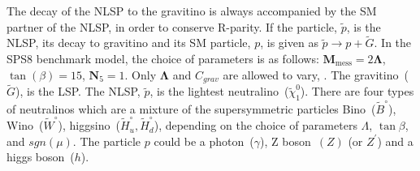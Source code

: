 {{%
The decay of the NLSP to the gravitino is always accompanied by the SM partner of the NLSP, in order to conserve R-parity.
If the particle, $\tilde{p}$, is the NLSP, its decay to gravitino and its SM particle, $p$, is given as $ \tilde{p}\rightarrow p + \tilde{G}$.
In the SPS8 benchmark model, the choice of parameters is as follows: $\mathbf{M}_{\mbox{mess}} = 2\mathbf{\Lambda}$, $ \tan(\beta)=15$, $\mathbf{N}_{5}=1$. Only $\mathbf{\Lambda}$ and $C_{grav}$ are allowed to vary, \cite{SPS8}.
The gravitino~($\tilde{G}$), is the LSP. The NLSP, $\tilde{p}$, is the lightest neutralino~($\tilde{\chi}^{0}_{1}$). 
There are four types of neutralinos which are a mixture of the supersymmetric particles Bino~($\tilde{B}^{\circ}$),  Wino~($\tilde{W}^{\circ}$), higgsino~($\tilde{H}^{\circ}_{u},\tilde{H}^{\circ}_{d}$), depending on the choice of parameters  $\Lambda$, $\tan\beta$, and $sgn(\mu)$.
The particle $p$ could be a photon~($\gamma$), Z boson~$(Z)$ (or $Z^{\prime}$) and a higgs boson~($h$).
}}
